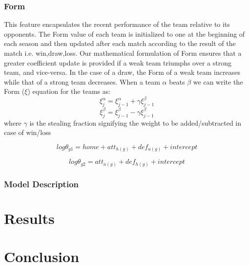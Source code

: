 \documentclass{article}
\begin{document}
\subsubsection{Form}
This feature encapsulates the recent performance of the team relative to its opponents. The Form value of each team is initialized to one at the beginning of each season and then updated after each match according to the result of the match i.e. win,draw,loss. Our mathematical formulation of Form ensures that a greater coefficient update is provided if a weak team triumphs over a strong team, and vice-versa. In the case of a draw, the Form of a weak team increases while that of a strong team decreases. 
When a team $\alpha$ beats $\beta$ we can write the Form ($\xi$) equation for the teams as:
\begin{equation}
\xi_{j}^{\alpha}= \xi_{j-1}^{\alpha}  + \gamma\xi_{j-1}^{\beta}
\label{eq:form_1}
\end{equation}
\begin{equation}
\xi_{j}^{\beta}= \xi_{j-1}^{\beta}  - \gamma\xi_{j-1}^{\beta}
\label{eq:form_2}
\end{equation}
where $\gamma$ is the stealing fraction signifying the weight to be added/subtracted in case of win/loss

\begin{equation}
log \theta_{g1} = home + att_{h(g)} + def_{a(g)} + intercept
\label{eq:log_g1}
\end{equation}

\begin{equation}
log \theta_{g2} = att_{a(g)} + def_{h(g)} + intercept
\label{eq:log_g2}
\end{equation}

\subsubsection{Model Description}



\section{Results}




\section{Conclusion}
\end{document}
